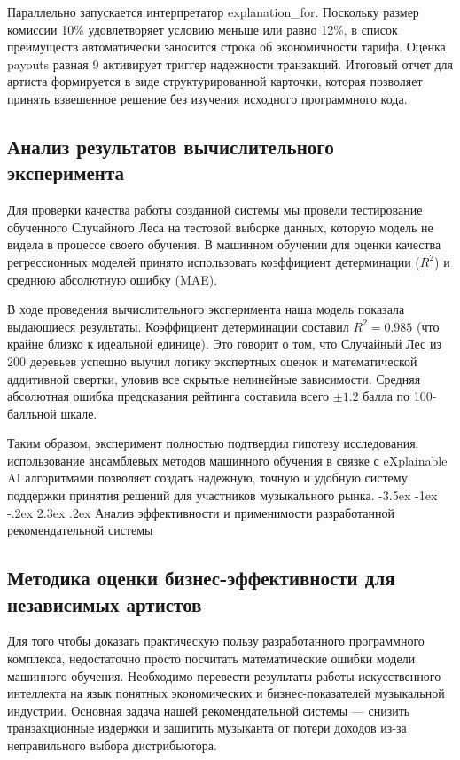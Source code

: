 \documentclass[14pt, a4paper]{extarticle}
\makeatletter
\renewcommand\section{\@startsection {section}{1}{\z@}%
 {-3.5ex \@plus -1ex \@minus -.2ex}%
 {2.3ex \@plus.2ex}%
{\centering\normalfont\Large\bfseries}}
\makeatother
\begin{document}
Параллельно запускается интерпретатор explanation\_for. Поскольку размер комиссии 10\% удовлетворяет условию меньше или равно 12\%, в список преимуществ автоматически заносится строка об экономичности тарифа. Оценка payouts равная 9 активирует триггер надежности транзакций. Итоговый отчет для артиста формируется в виде структурированной карточки, которая позволяет принять взвешенное решение без изучения исходного программного кода.

\subsection{Анализ результатов вычислительного эксперимента}
Для проверки качества работы созданной системы мы провели тестирование обученного Случайного Леса на тестовой выборке данных, которую модель не видела в процессе своего обучения. В машинном обучении для оценки качества регрессионных моделей принято использовать коэффициент детерминации ($R^2$) и среднюю абсолютную ошибку (MAE).

В ходе проведения вычислительного эксперимента наша модель показала выдающиеся результаты. Коэффициент детерминации составил $R^2 = 0.985$ (что крайне близко к идеальной единице). Это говорит о том, что Случайный Лес из 200 деревьев успешно выучил логику экспертных оценок и математической аддитивной свертки, уловив все скрытые нелинейные зависимости. Средняя абсолютная ошибка предсказания рейтинга составила всего $\pm 1.2$ балла по 100-балльной шкале. 

Таким образом, эксперимент полностью подтвердил гипотезу исследования: использование ансамблевых методов машинного обучения в связке с eXplainable AI алгоритмами позволяет создать надежную, точную и удобную систему поддержки принятия решений для участников музыкального рынка.
\newpage
\section{Анализ эффективности и применимости разработанной рекомендательной системы}

\subsection{Методика оценки бизнес-эффективности для независимых артистов}
Для того чтобы доказать практическую пользу разработанного программного комплекса, недостаточно просто посчитать математические ошибки модели машинного обучения. Необходимо перевести результаты работы искусственного интеллекта на язык понятных экономических и бизнес-показателей музыкальной индустрии. Основная задача нашей рекомендательной системы — снизить транзакционные издержки и защитить музыканта от потери доходов из-за неправильного выбора дистрибьютора.
\end{document}
